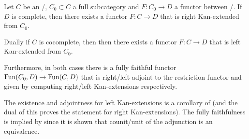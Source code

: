 \begin{prop}\label{prop:exKanExt}
    Let $C$ be an \inftycat/, $C_0\subset C$ a full subcategory and $F\colon C_0\to D$ a functor between \inftycats/.
    If $D$ is complete, then there exists a functor $F\colon C\to D$ that is right Kan-extended from $C_0$.

    Dually if $C$ is cocomplete, then then there exists a functor $F\colon C\to D$ that is left Kan-extended from $C_0$.
    
    Furthermore, in both cases there is a fully faithful functor $\operatorname{Fun}(C_0,D)\to\operatorname{Fun}(C,D)$ that is right/left adjoint to the restriction functor and given by computing right/left Kan-extensions respectively.
    \begin{reference}
        The existence and adjointness for left Kan-extensions is a corollary of \cite[Corollary 7.3.6.4]{kerodon} (and the dual of this proves the statement for right Kan-extensions).
        The fully faithfulness is implied by \cite[Corollary 7.3.1.16]{kerodon} since it is shown that counit/unit of the adjunction is an equivalence.
    \end{reference}
\end{prop}
